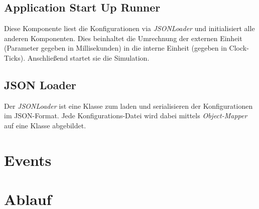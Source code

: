 \subsection{Application Start Up Runner}
Diese Komponente liest die Konfigurationen via \textit{JSONLoader} und initialisiert alle anderen Komponenten. Dies beinhaltet die Umrechnung der externen Einheit (Parameter gegeben in Millisekunden) in die interne Einheit (gegeben in Clock-Ticks). Anschließend startet sie die Simulation.

\subsection{JSON Loader}
Der \textit{JSONLoader} ist eine Klasse zum laden und serialisieren der Konfigurationen im JSON-Format. Jede Konfigurations-Datei wird dabei mittels \textit{Object-Mapper} auf eine Klasse abgebildet.

\section{Events}
\label{sec:Aufbau:Events}


\section{Ablauf}



